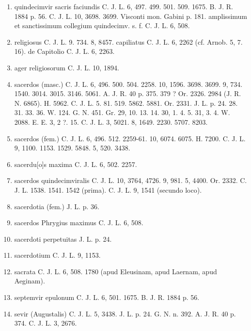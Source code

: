 \documentclass[a4paper, 11pt, oneside, polutonikogreek, german]{article}
\begin{document}
\begin{enumerate}
\item quindecimvir sacris faciundis C. J. L. 6, 497. 499. 501. 509. 1675. B. J. R. 1884 p. 56. C. J. L. 10, 3698. 3699. Visconti mon. Gabini p. 181. amplissimum et sanctissimum collegium quindecimv. s. f. C. J. L. 6, 508.

\item religiosus C. J. L. 9. 734. 8, 8457. capiliatus C. J. L. 6, 2262 (cf. Arnob. 5, 7. 16). de Capitolio C. J. L. 6, 2263.

\item ager religiosorum C. J. L. 10, 1894.

\item sacerdos (masc.) C. J. L. 6, 496. 500. 504. 2258. 10, 1596. 3698. 3699. 9, 734. 1540. 3014. 3015. 3146. 5061. A. J. R. 40 p. 375. 379 ? Or. 2326. 2984 (J. R. N. 6865). H. 5962. C. J. L. 5. 81. 519. 5862. 5881. Or. 2331. J. L. p. 24. 28. 31. 33. 36. W. 124. G. N. 451. Gr. 29, 10. 13. 14. 30, 1. 4. 5. 31, 3. 4. W. 2088. E. E. 3, 2 ?. 15. C. J. L. 3, 5021. 8, 1649. 2230. 5707. 8203.

\item sacerdos (fem.) C. J. L. 6, 496. 512. 2259-61. 10, 6074. 6075. H. 7200. C. J. L. 9, 1100. 1153. 1529. 5848. 5, 520. 3438.

\item sacerdu[o]s maxima C. J. L. 6, 502. 2257.

\item sacerdos quindecimviralis C. J. L. 10, 3764, 4726. 9, 981. 5, 4400. Or. 2332. C. J. L. 1538. 1541. 1542 (prima). C. J. L. 9, 1541 (secundo loco).

\item sacerdotia (fem.) J. L. p. 36.

\item sacerdos Phrygius maximus C. J. L. 6, 508.

\item sacerdoti perpetuitas J. L. p. 24.

\item sacerdotium C. J. L. 9, 1153.

\item sacrata C. J. L. 6, 508. 1780 (apud Eleusinam, apud Laernam, apud Aeginam).

\item septemvir epulonum C. J. L. 6, 501. 1675. B. J. R. 1884 p. 56.

\item sevir (Augustalis) C. J. L. 5, 3438. J. L. p. 24. G. N. n. 392. A. J. R. 40 p. 374. C. J. L. 3, 2676.


\end{enumerate}
\end{document}

